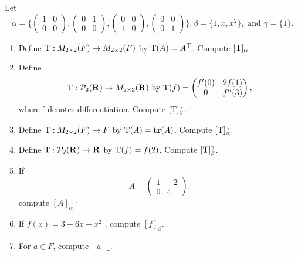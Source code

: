 \begin{exercise} \label{exercise 2.2.5}
Let
\[
    \alpha = \bigg\{
                \begin{pmatrix} 1 & 0 \\ 0 & 0 \end{pmatrix},
                \begin{pmatrix} 0 & 1 \\ 0 & 0 \end{pmatrix},
                \begin{pmatrix} 0 & 0 \\ 1 & 0 \end{pmatrix},
                \begin{pmatrix} 0 & 0 \\ 0 & 1 \end{pmatrix}
            \bigg\},
    \beta = \{ 1, x, x^{2} \},
    \text { and }
    \gamma = \{ 1 \}.
\]
\begin{enumerate}
\item Define \(\mathrm{T} : M_{2 \times 2}(F) \to M_{2 \times 2}(F)\) by \(\mathrm{T}(A) = A^\top\).
Compute \([\mathrm{T}]_{\alpha}\).
\item Define
\[
    \mathrm{T}: \mathcal{P}_2(\mathbf{R}) \to M_{2 \times 2}(\mathbf{R}) \text{ by }
    \mathrm{T}(f) = \begin{pmatrix} f'(0) & 2f(1) \\ 0 & f''(3) \end{pmatrix},
\]
where \('\) denotes differentiation.
Compute \([\mathrm{T}]_{\beta}^{\alpha}\).
\item Define \(\mathrm{T}: M_{2 \times 2}(F) \to F\) by \(\mathrm{T}(A) = \textbf{tr}(A)\).
Compute \([\mathrm{T}]_{\alpha}^{\gamma}\).
\item Define \(\mathrm{T}: \mathcal{P}_2(\mathbf{R}) \to \mathbf{R}\) by \(\mathrm{T}(f) = f(2)\). 
Compute \([\mathrm{T}]_{\beta}^{\gamma}\).
\item If
\[
    A = \begin{pmatrix} 1 & -2 \\ 0 & 4 \end{pmatrix}.
\]
compute \([A]_{\alpha}\)·
\item If \(f(x) = 3 - 6x + x^2\) , compute \([f]_{\beta}\).
\item For \(a \in F\), compute \([a]_{\gamma}\).
\end{enumerate}
\end{exercise}

